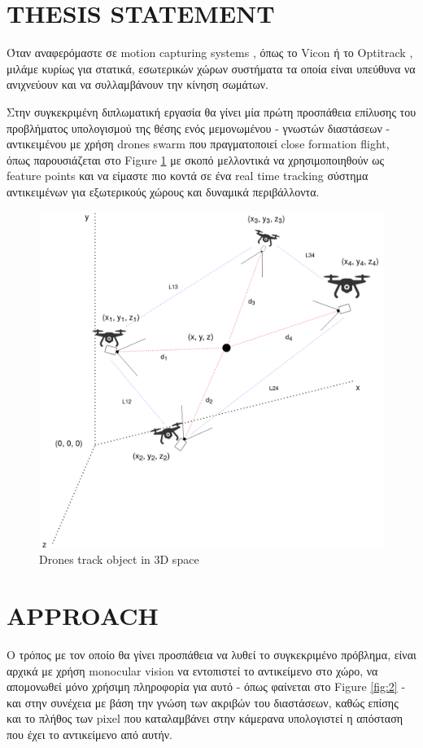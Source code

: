 \section{THESIS STATEMENT}
Όταν αναφερόμαστε σε motion capturing systems \cite{motion-capture}, όπως το Vicon \cite{vicon} 
ή το Optitrack \cite{optitrack}, μιλάμε κυρίως για στατικά, εσωτερικών χώρων συστήματα 
τα οποία είναι υπεύθυνα να ανιχνεύουν και να συλλαμβάνουν την κίνηση σωμάτων.

Στην συγκεκριμένη διπλωματική εργασία θα γίνει μία πρώτη προ\-σπά\-θεια επίλυσης του 
προβλήματος υπο\-λο\-γι\-σμού της θέσης ενός μεμονωμένου - γνωστών διαστάσεων - αντικειμένου 
με χρήση drones swarm που πραγματοποιεί close formation flight, όπως παρουσιάζεται στο Figure \ref{fig:1} με σκοπό μελλοντικά να χρησιμοποιηθούν ως feature points και 
να είμαστε πιο κοντά σε ένα real time tra\-cking σύστημα αντικειμένων για εξωτερικούς χώρους και δυναμικά περιβάλλοντα.


\begin{figure}[thpb]
  \centering
  \includegraphics[width=\linewidth]{Images/3dDrones-camera-pose.png}
  \caption{Drones track object in 3D space}
  \label{fig:1}
\end{figure}

\section{APPROACH}
Ο τρόπος με τον οποίο θα γίνει προσπάθεια να λυθεί το συγκεκριμένο πρόβλημα, είναι αρχικά με χρήση monocular
vision να εντοπιστεί το αντικείμενο στο χώρο, να απομονωθεί μόνο χρήσιμη πληροφορία για αυτό   
- όπως φαίνεται στο Figure \ref{fig:2} - και στην συνέχεια με βάση την γνώση των ακριβών του διαστάσεων,
καθώς επίσης και το πλήθος των pixel που καταλαμβάνει στην κάμερα\udot να υπολογιστεί η απόσταση που 
έχει το αντικείμενο από αυτήν. 

